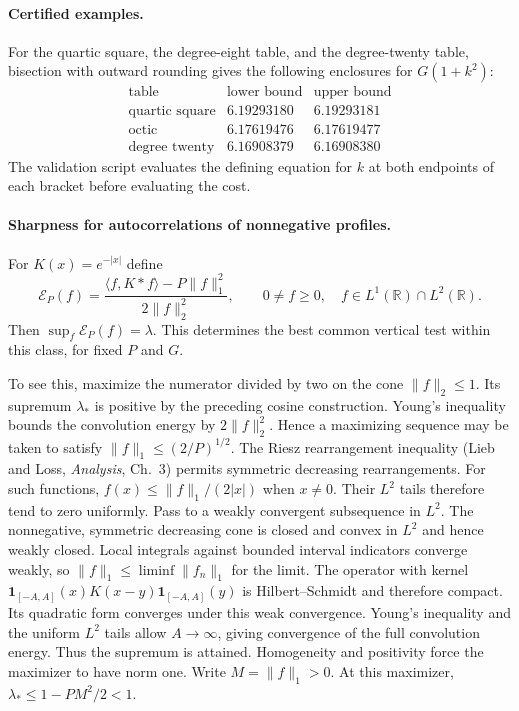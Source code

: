 \documentclass[11pt]{article}
\begin{document}
\paragraph{Certified examples.}
For the quartic square, the degree-eight table, and the degree-twenty table, bisection with outward rounding gives the following enclosures for $G(1+k^2)$:
\[
\begin{array}{lcc}
\text{table}&\text{lower bound}&\text{upper bound}\\ \hline
\text{quartic square}&6.19293180&6.19293181\\
\text{octic}&6.17619476&6.17619477\\
\text{degree twenty}&6.16908379&6.16908380
\end{array}
\]
The validation script evaluates the defining equation for $k$ at both endpoints of each bracket before evaluating the cost.

\paragraph{Sharpness for autocorrelations of nonnegative profiles.}
For $K(x)=e^{-|x|}$ define
\[
 \mathcal{E}_P(f)=
 \frac{\langle f,K*f\rangle-P\|f\|_1^2}{2\|f\|_2^2},
 \qquad 0\ne f\ge0,\quad f\in L^1(\mathbb R)\cap L^2(\mathbb R).
\]
Then $\sup_f\mathcal{E}_P(f)=\lambda$. This determines the best
common vertical test within this class, for fixed $P$ and $G$.

To see this, maximize the numerator divided by two on the cone
$\|f\|_2\le1$. Its supremum $\lambda_*$ is positive by the preceding
cosine construction. Young's inequality bounds the convolution energy by
$2\|f\|_2^2$. Hence a maximizing sequence may be taken to satisfy
$\|f\|_1\le(2/P)^{1/2}$. The Riesz rearrangement inequality
(Lieb and Loss, \emph{Analysis}, Ch.~3) permits symmetric decreasing
rearrangements. For such functions,
$f(x)\le\|f\|_1/(2|x|)$ when $x\ne0$. Their $L^2$ tails therefore
tend to zero uniformly. Pass to a weakly convergent subsequence in
$L^2$. The nonnegative, symmetric decreasing cone is closed and convex
in $L^2$ and hence weakly closed. Local integrals against bounded
interval indicators converge weakly, so $\|f\|_1\le\liminf\|f_n\|_1$
for the limit. The operator with kernel
$\mathbf1_{[-A,A]}(x)K(x-y)\mathbf1_{[-A,A]}(y)$ is Hilbert--Schmidt
and therefore compact. Its quadratic form converges under this weak
convergence. Young's inequality and the uniform $L^2$ tails allow
$A\to\infty$, giving convergence of the full convolution energy.
Thus the supremum is attained. Homogeneity and positivity force the
maximizer to have norm one. Write $M=\|f\|_1>0$. At this maximizer,
$\lambda_*\le1-PM^2/2<1$.
\end{document}
